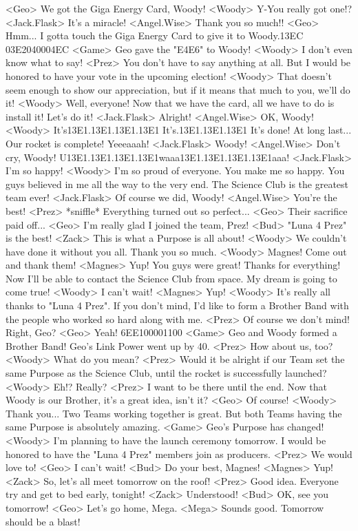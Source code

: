 <Geo> We got the Giga Energy Card, Woody! 
<Woody> Y-You really got one!? 
<Jack.Flask> It's a miracle! 
<Angel.Wise> Thank you so much!! 
<Geo> Hmm... I gotta touch the Giga Energy Card to give it to Woody.{13}{EC} {03}{E2}{04}{00}{04}{EC} 
<Game> Geo gave the "{E4}{E6}" to Woody! 
<Woody> I don't even know what to say! 
<Prez> You don't have to say anything at all. 
But I would be honored to have your vote in the upcoming election! 
<Woody> That doesn't seem enough to show our appreciation, 
but if it means that much to you, we'll do it! 
<Woody> Well, everyone! 
Now that we have the card, all we have to do is install it! Let's do it! 
<Jack.Flask> Alright! 
<Angel.Wise> OK, Woody! 
<Woody> It's{13}{E1}.{13}{E1}.{13}{E1}.{13}{E1} It's.{13}{E1}.{13}{E1}.{13}{E1} 
It's done! 
At long last... Our rocket is complete! 
Yeeeaaah! 
<Jack.Flask> Woody! 
<Angel.Wise> Don't cry, Woody! 
U{13}{E1}.{13}{E1}.{13}{E1}.{13}{E1}waaa{13}{E1}.{13}{E1}.{13}{E1}.{13}{E1}aaa! 
<Jack.Flask> I'm so happy! 
<Woody> I'm so proud of everyone. You make me so happy. 
You guys believed in me all the way to the very end. 
The Science Club is the greatest team ever! 
<Jack.Flask> Of course we did, Woody! 
<Angel.Wise> You're the best! 
<Prez> *sniffle* Everything turned out so perfect... 
<Geo> Their sacrifice paid off... 
<Geo> I'm really glad I joined the team, Prez! 
<Bud> "Luna 4 Prez" is the best! 
<Zack> This is what a Purpose is all about! 
<Woody> We couldn't have done it without you all. 
Thank you so much. 
<Woody> Magnes! Come out and thank them! 
<Magnes> Yup! You guys were great! Thanks for everything! 
Now I'll be able to contact the Science Club from space. 
My dream is going to come true! 
<Woody> I can't wait! 
<Magnes> Yup! 
<Woody> It's really all thanks to "Luna 4 Prez". 
If you don't mind, I'd like to form a Brother Band 
with the people who worked so hard along with me. 
<Prez> Of course we don't mind! Right, Geo? 
<Geo> Yeah! 
{6E}{E1}{00}{00}{11}{00} 
<Game> Geo and Woody formed a Brother Band! 
Geo's Link Power went up by 40. 
<Prez> How about us, too? 
<Woody> What do you mean? 
<Prez> Would it be alright if our Team set the same Purpose as the Science 
Club, until the rocket is successfully launched? 
<Woody> Eh!? Really? 
<Prez> I want to be there until the end. 
Now that Woody is our Brother, it's a great idea, isn't it? 
<Geo> Of course! 
<Woody> Thank you... 
Two Teams working together is great. 
But both Teams having the same Purpose is absolutely amazing. 
<Game> Geo's Purpose has changed! 
<Woody> I'm planning to have the launch ceremony tomorrow. 
I would be honored to have the "Luna 4 Prez" members join as producers. 
<Prez> We would love to! 
<Geo> I can't wait! 
<Bud> Do your best, Magnes! 
<Magnes> Yup! 
<Zack> So, let's all meet tomorrow on the roof! 
<Prez> Good idea. Everyone try and get to bed early, tonight! 
<Zack> Understood! 
<Bud> OK, see you tomorrow! 
<Geo> Let's go home, Mega. 
<Mega> Sounds good. Tomorrow should be a blast! 

